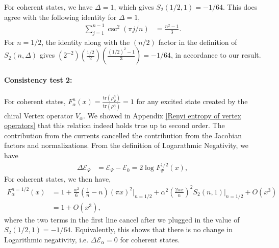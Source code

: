 \documentclass[11pt]{article}
\newcommand{\lb}{\left(}
\newcommand{\rb}{\right)}
\begin{document}
For coherent states, we have $\Delta = 1$, which gives $S_2(1/2,1) = -1/64$. This does agree with the following identity for $\Delta = 1$,
\begin{align}
    \sum_{j=1}^{n-1} \csc^2 (\pi j/n) &= \frac{n^2-1}{3}.
\end{align}
For $n=1/2$, the identity along with the $\lb n/2\rb $ factor in the definition of $S_2(n,\Delta)$ gives $\lb2^{-2}\rb\lb \frac{1/2}{2}\rb\lb \frac{\lb1/2\rb^2-1}{3}\rb = -1/64$, in accordance to our result.

\paragraph{Consistency test 2:}

For coherent states, $F_{\alpha}^n(x) = \frac{\text{tr}(\rho_\Psi^n)}{\text{tr}(\rho_0^n)} = 1$ for any excited state created by the chiral Vertex operator $V_\alpha$. We showed in Appendix \ref{Renyi entropy of vertex operators} that this relation indeed holds true up to second order. The contribution from the currents cancelled the contribution from the Jacobian factors and normalizations. From the definition of Logarathmic Negativity, we have
\begin{align}
    \Delta \mathcal{E}_\Psi &= \mathcal{E}_\Psi - \mathcal{E}_0 = 2\log F_\Psi^{1/2}(x),
\end{align}
For coherent states, we then have,
\begin{align}
    F_\alpha^{n=1/2}(x) &= 1+ \frac{\alpha^2}{6}\lb \frac{1}{n}-n \rb \lb \pi x\rb^2\Bigg|_{n=1/2} + \alpha^2 \lb \frac{2\pi x}{n}\rb^2 S_2(n,1) \Bigg|_{n=1/2} + O(x^3) \\
    &=1+ O(x^3),
\end{align}
where the two terms in the first line cancel after we plugged in the value of $S_2(1/2,1) = -1/64$. Equivalently, this shows that there is no change in Logarithmic negativity, i.e. $\Delta \mathcal{E}_\alpha=0$ for coherent states. 
\end{document}
